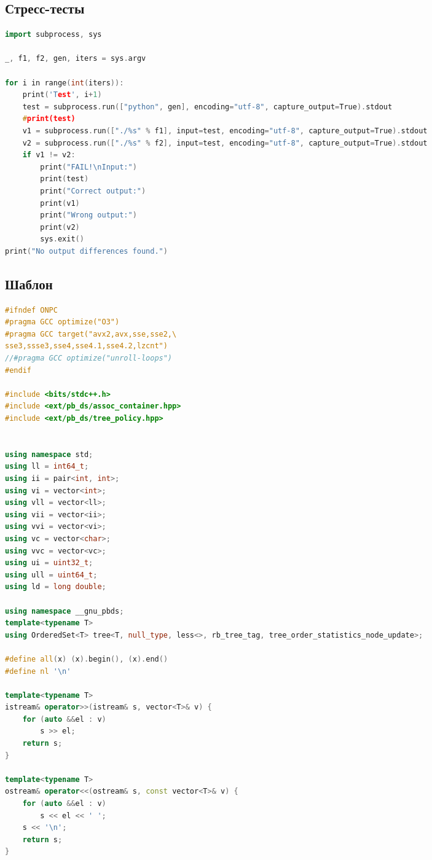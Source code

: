 \documentclass[10pt,a4paper,landscape,twosided]{extarticle}
\begin{document}
\begin{multicols}{3}
\subsection{Стресс-тесты}
\begin{lstlisting}[language=C++]
import subprocess, sys

_, f1, f2, gen, iters = sys.argv

for i in range(int(iters)):
    print('Test', i+1)
    test = subprocess.run(["python", gen], encoding="utf-8", capture_output=True).stdout
    #print(test)
    v1 = subprocess.run(["./%s" % f1], input=test, encoding="utf-8", capture_output=True).stdout
    v2 = subprocess.run(["./%s" % f2], input=test, encoding="utf-8", capture_output=True).stdout
    if v1 != v2:
        print("FAIL!\nInput:")
        print(test)
        print("Correct output:")
        print(v1)
        print("Wrong output:")
        print(v2)
        sys.exit()
print("No output differences found.")
\end{lstlisting}

\subsection{Шаблон}
\begin{lstlisting}[language=C++]
#ifndef ONPC
#pragma GCC optimize("O3")
#pragma GCC target("avx2,avx,sse,sse2,\
sse3,ssse3,sse4,sse4.1,sse4.2,lzcnt")
//#pragma GCC optimize("unroll-loops")
#endif

#include <bits/stdc++.h>
#include <ext/pb_ds/assoc_container.hpp>
#include <ext/pb_ds/tree_policy.hpp>


using namespace std;
using ll = int64_t;
using ii = pair<int, int>;
using vi = vector<int>;
using vll = vector<ll>;
using vii = vector<ii>;
using vvi = vector<vi>;
using vc = vector<char>;
using vvc = vector<vc>;
using ui = uint32_t;
using ull = uint64_t;
using ld = long double;

using namespace __gnu_pbds;
template<typename T>
using OrderedSet<T> tree<T, null_type, less<>, rb_tree_tag, tree_order_statistics_node_update>;

#define all(x) (x).begin(), (x).end()
#define nl '\n'

template<typename T>
istream& operator>>(istream& s, vector<T>& v) {
    for (auto &&el : v)
        s >> el;
    return s;
}

template<typename T>
ostream& operator<<(ostream& s, const vector<T>& v) {
    for (auto &&el : v)
        s << el << ' ';
    s << '\n';
    return s;
}


\end{lstlisting}
\end{multicols}
\end{document}
